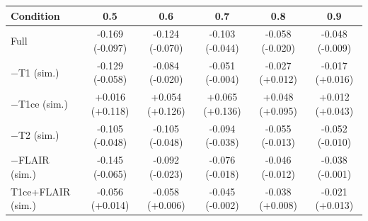 \begin{tabular}{lccccc}
\toprule
Condition & 0.5 & 0.6 & 0.7 & 0.8 & 0.9 \\
\midrule
Full & -0.169 (-0.097) & -0.124 (-0.070) & -0.103 (-0.044) & -0.058 (-0.020) & -0.048 (-0.009) \\
$-$T1 (sim.) & -0.129 (-0.058) & -0.084 (-0.020) & -0.051 (-0.004) & -0.027 (+0.012) & -0.017 (+0.016) \\
$-$T1ce (sim.) & +0.016 (+0.118) & +0.054 (+0.126) & +0.065 (+0.136) & +0.048 (+0.095) & +0.012 (+0.043) \\
$-$T2 (sim.) & -0.105 (-0.048) & -0.105 (-0.048) & -0.094 (-0.038) & -0.055 (-0.013) & -0.052 (-0.010) \\
$-$FLAIR (sim.) & -0.145 (-0.065) & -0.092 (-0.023) & -0.076 (-0.018) & -0.046 (-0.012) & -0.038 (-0.001) \\
T1ce+FLAIR (sim.) & -0.056 (+0.014) & -0.058 (+0.006) & -0.045 (-0.002) & -0.038 (+0.008) & -0.021 (+0.013) \\
\bottomrule
\end{tabular}
